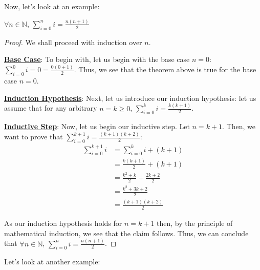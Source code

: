 \documentclass[openany]{book}
\let\oldsum\sum
\renewcommand{\sum}[2]{\oldsum\limits_{#1}^{#2}}
\begin{document}
Now, let's look at an example:
\begin{theorem}
	$\forall n\in\mathbb{N}$, $\sum{i=0}{n} i = \frac{n(n+1)}{2}$
\end{theorem}
\begin{proof}
	We shall proceed with induction over $n$.
	
	\textbf{\underline{Base Case}}: To begin with, let us begin with the base case $n=0$: $\sum{i=0}{0} i = 0 = \frac{0(0+1)}{2}$. Thus, we see that the theorem above is true for the base case $n=0$.
	
	\textbf{\underline{Induction Hypothesis}}: Next, let us introduce our induction hypothesis: let us assume that for any arbitrary $n=k\geq 0$, $\sum{i=0}{k} i = \frac{k(k+1)}{2}$.
	
	\textbf{\underline{Inductive Step}}: Now, let us begin our inductive step. Let $n=k+1$. Then, we want to prove that $\sum{i=0}{k+1} i = \frac{(k+1)(k+2)}{2}$:
	\begin{align*}
		\sum{i=0}{k+1} i &= \sum{i=0}{k} i + (k+1) \\
		&= \frac{k(k+1)}{2} + (k+1) \\
		&= \frac{k^2+k}{2} + \frac{2k+2}{2} \\
		&= \frac{k^2 + 3k + 2}{2} \\
		&= \frac{(k+1)(k+2)}{2}
	\end{align*}
	
	As our induction hypothesis holds for $n=k+1$ then, by the principle of mathematical induction, we see that the claim follows. Thus, we can conclude that $\forall n\in\mathbb{N}$, $\sum{i=0}{n} i = \frac{n(n+1)}{2}$.
\end{proof}

Let's look at another example:
\end{document}
